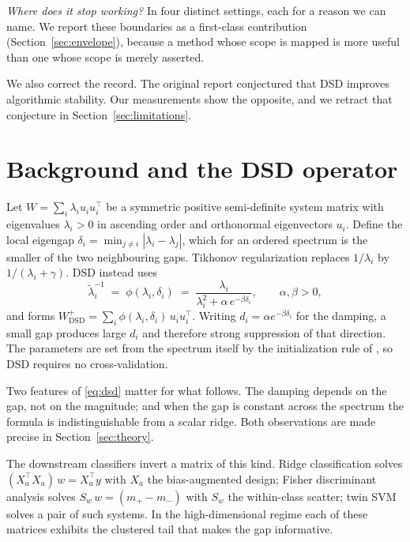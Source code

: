 \documentclass[preprint,12pt]{elsarticle}
\begin{document}
\emph{Where does it stop working?} In four distinct settings, each for a reason we can name. We report
these boundaries as a first-class contribution (Section~\ref{sec:envelope}), because a method whose
scope is mapped is more useful than one whose scope is merely asserted.

We also correct the record. The original report conjectured that DSD improves algorithmic stability.
Our measurements show the opposite, and we retract that conjecture in Section~\ref{sec:limitations}.

\section{Background and the DSD operator}
\label{sec:background}

Let $W = \sum_{i} \lambda_i u_i u_i^\top$ be a symmetric positive semi-definite system matrix with
eigenvalues $\lambda_i > 0$ in ascending order and orthonormal eigenvectors $u_i$. Define the local
eigengap $\delta_i = \min_{j \neq i} |\lambda_i - \lambda_j|$, which for an ordered spectrum is the
smaller of the two neighbouring gaps. Tikhonov regularization replaces $1/\lambda_i$ by
$1/(\lambda_i + \gamma)$. DSD instead uses
\begin{equation}
\label{eq:dsd}
\tilde{\lambda}_i^{-1} \;=\; \phi(\lambda_i, \delta_i) \;=\;
\frac{\lambda_i}{\lambda_i^2 + \alpha\, e^{-\beta \delta_i}}, \qquad \alpha,\beta > 0,
\end{equation}
and forms $W^{+}_{\mathrm{DSD}} = \sum_i \phi(\lambda_i,\delta_i)\, u_i u_i^\top$. Writing
$d_i = \alpha e^{-\beta \delta_i}$ for the damping, a small gap produces large $d_i$ and therefore
strong suppression of that direction. The parameters are set from the spectrum itself by the
initialization rule of \cite{vashishtha2026dsd}, so DSD requires no cross-validation.

Two features of \eqref{eq:dsd} matter for what follows. The damping depends on the gap, not on the
magnitude; and when the gap is constant across the spectrum the formula is indistinguishable from a
scalar ridge. Both observations are made precise in Section~\ref{sec:theory}.

The downstream classifiers invert a matrix of this kind. Ridge classification solves
$(X_a^\top X_a)\,w = X_a^\top y$ with $X_a$ the bias-augmented design; Fisher discriminant analysis
solves $S_w\, w = (m_+ - m_-)$ with $S_w$ the within-class scatter; twin SVM \cite{kumar2009lstsvm}
solves a pair of such systems. In the high-dimensional regime each of these matrices exhibits the
clustered tail that makes the gap informative.
\end{document}
